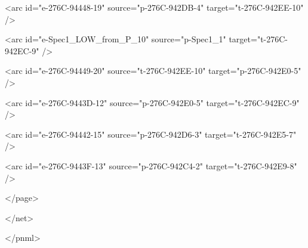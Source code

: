    <arc id="e-276C-94448-19" source="p-276C-942DB-4" target="t-276C-942EE-10" />

   <arc id="e-Spec1\_LOW\_from\_P\_10" source="p-Spec1\_1" target="t-276C-942EC-9" />

   <arc id="e-276C-94449-20" source="t-276C-942EE-10" target="p-276C-942E0-5" />

   <arc id="e-276C-9443D-12" source="p-276C-942E0-5" target="t-276C-942EC-9" />

   <arc id="e-276C-94442-15" source="p-276C-942D6-3" target="t-276C-942E5-7" />

   <arc id="e-276C-9443F-13" source="p-276C-942C4-2" target="t-276C-942E9-8" />

  </page>

 </net>

</pnml>
